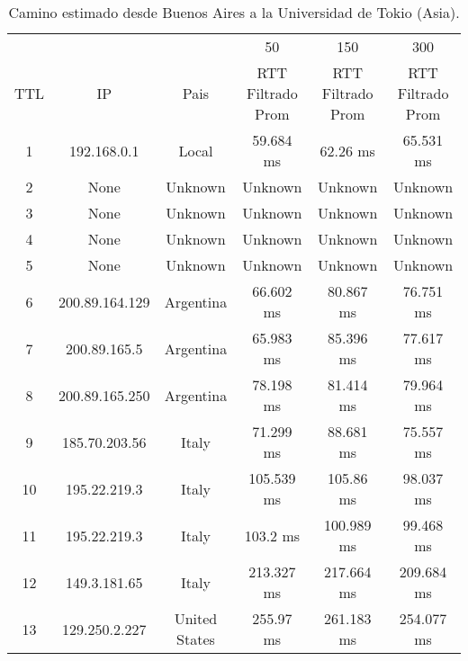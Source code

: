 
\begin{table}[H]
\centering
\caption{Camino estimado desde Buenos Aires a la Universidad de Tokio (Asia).}
\begin{tabular}{ | c | c | c | c | c | c | }
\hline
 &&& 50 & 150 & 300 \\ %
TTL	&         IP     &    	        Pais     &   	 RTT Filtrado Prom & 	 RTT Filtrado Prom  &	 RTT Filtrado Prom \\ \hline  
1	&192.168.0.1     &    	       Local     &   	      59.684 ms    & 	       62.26 ms     &	      65.531 ms  \\ \hline    
2	&None            &    	      Unknown    &   	      Unknown      & 	      Unknown       &	      Unknown    \\ \hline    
3	&None            &    	      Unknown    &   	      Unknown      & 	      Unknown       &	      Unknown    \\ \hline    
4	&None            &    	      Unknown    &   	      Unknown      & 	      Unknown       &	      Unknown    \\ \hline    
5	&None            &    	      Unknown    &   	      Unknown      & 	      Unknown       &	      Unknown    \\ \hline    
6	&200.89.164.129  &    	     Argentina   &   	      66.602 ms    & 	      80.867 ms     &	      76.751 ms  \\ \hline    
7	&200.89.165.5    &    	     Argentina   &   	      65.983 ms    & 	      85.396 ms     &	      77.617 ms  \\ \hline    
8	&200.89.165.250  &    	     Argentina   &   	      78.198 ms    & 	      81.414 ms     &	      79.964 ms  \\ \hline    
9	&185.70.203.56   &    	       Italy     &   	      71.299 ms    & 	      88.681 ms     &	      75.557 ms  \\ \hline    
10	&195.22.219.3    &    	       Italy     &   	     105.539 ms    & 	      105.86 ms     &	      98.037 ms  \\ \hline    
11	&195.22.219.3    &    	       Italy     &   	       103.2 ms    & 	     100.989 ms     &	      99.468 ms  \\ \hline    
12	&149.3.181.65    &    	       Italy     &   	     213.327 ms    & 	     217.664 ms     &	     209.684 ms  \\ \hline    
13	&129.250.2.227   &    	   United States &   	      255.97 ms    & 	     261.183 ms     &	     254.077 ms  \\ \hline    

\end{tabular}
\end{table}
